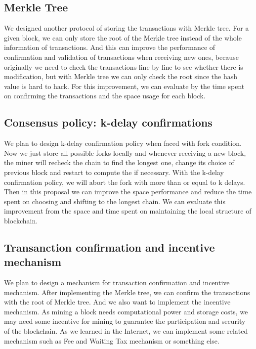 \documentclass{article}
\begin{document}
    \subsection{Merkle Tree}
    We designed another protocol of storing the transactions with Merkle tree. For a given block, we can only store the root of the Merkle tree instead of the whole information of transactions. And this can improve the performance of confirmation and validation of transactions when receiving new ones, because originally we need to check the transactions line by line to see whether there is modification, but with Merkle tree we can only check the root since the hash value is hard to hack. For this improvement, we can evaluate by the time spent on confirming the transactions and the space usage for each block.

    \subsection{Consensus policy: k-delay confirmations}
    We plan to design k-delay confirmation policy when faced with fork condition. Now we just store all possible forks locally and whenever receiving a new block, the miner will recheck the chain to find the longest one, change its choice of previous block and restart to compute the if necessary. With the k-delay confirmation policy, we will abort the fork with more than or equal to k delays. Then in this proposal we can improve the space performance and reduce the time spent on choosing and shifting to the longest chain. We can evaluate this improvement from the space and time spent on maintaining the local structure of blockchain.

    \subsection{Transanction confirmation and incentive mechanism}
    We plan to design a mechanism for transaction confirmation and incentive mechanism. After implementing the Merkle tree, we can confirm the transactions with the root of Merkle tree. And we also want to implement the incentive mechanism. As mining a block needs computational power and storage costs, we may need some incentive for mining to guarantee the participation and security of the blockchain. As we learned in the Internet, we can implement some related mechanism such as Fee and Waiting Tax mechanism or something else.

\end{document}
